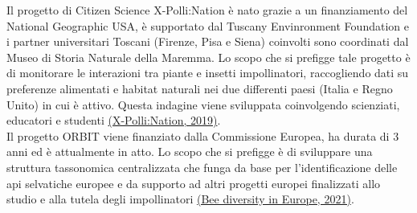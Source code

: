 \documentclass[main.tex]{subfiles}
\begin{document}
Il progetto di Citizen Science X-Polli:Nation è nato grazie a un finanziamento del National Geographic USA, è supportato dal Tuscany Envinronment Foundation e i partner universitari Toscani (Firenze, Pisa e Siena) coinvolti sono coordinati dal Museo di Storia Naturale della Maremma. Lo scopo che si prefigge tale progetto è di monitorare le interazioni tra piante e insetti impollinatori, raccogliendo dati su preferenze alimentati e habitat naturali nei due differenti paesi (Italia e Regno Unito) in cui è attivo. Questa indagine viene sviluppata coinvolgendo scienziati, educatori e studenti \href{https://xpollination.org/}{(X-Polli:Nation, 2019)}.\\
Il progetto ORBIT viene finanziato dalla Commissione Europea, ha durata di 3 anni ed è attualmente in atto. Lo scopo che si prefigge è di sviluppare una struttura tassonomica centralizzata che funga da base per l'identificazione delle api selvatiche europee e da supporto ad altri progetti europei finalizzati allo studio e alla tutela degli impollinatori \href{https://orbit-project.eu/}{(Bee diversity in Europe, 2021)}.
\end{document}
